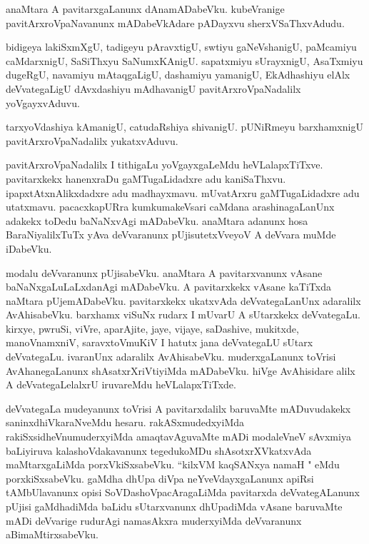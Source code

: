 \documentclass{article}
\begin{document}
\begin{mn}%
anaMtara A pavitarxgaLanunx dAnamADabeVku. kubeVranige pavitArxroVpaNavanunx mADabeVkAdare pADayxvu 
sherxVSaThxvAdudu.
\end{mn}

\begin{mn}%
bidigeya lakiSxmXgU, tadigeyu pAravxtigU, swtiyu gaNeVshanigU, paMcamiyu caMdarxnigU, SaSiThxyu 
SaNumxKAnigU. sapatxmiyu sUrayxnigU, AsaTxmiyu dugeRgU, navamiyu mAtaqgaLigU, dashamiyu yamanigU, 
EkAdhashiyu elAlx deVvategaLigU dAvxdashiyu mAdhavanigU pavitArxroVpaNadalilx yoVgayxvAduvu.
\end{mn}

\begin{mn}%
tarxyoVdashiya kAmanigU, catudaRshiya shivanigU. pUNiRmeyu barxhamxnigU pavitArxroVpaNadalilx 
yukatxvAduvu.
\end{mn}

\begin{mn}%
pavitArxroVpaNadalilx I tithigaLu yoVgayxgaLeMdu heVLalapxTiTxve. pavitarxkekx hanenxraDu 
gaMTugaLidadxre adu kaniSaThxvu. ipapxtAtxnAlikxdadxre adu madhayxmavu. mUvatArxru gaMTugaLidadxre 
adu utatxmavu. pacacxkapURra kumkumakeVsari caMdana arashinagaLanUnx adakekx toDedu baNaNxvAgi 
mADabeVku. anaMtara adanunx hosa BaraNiyalilxTuTx yAva deVvaranunx pUjisutetxVveyoV A deVvara 
muMde iDabeVku.
\end{mn}

\begin{mn}%
modalu deVvaranunx pUjisabeVku. anaMtara A pavitarxvanunx vAsane  baNaNxgaLuLaLxdanAgi mADabeVku. A 
pavitarxkekx vAsane kaTiTxda naMtara pUjemADabeVku. pavitarxkekx ukatxvAda deVvategaLanUnx 
adaralilx AvAhisabeVku. barxhamx viSuNx rudarx I mUvarU A sUtarxkekx deVvategaLu. kirxye, pwruSi, 
viVre, aparAjite, jaye, vijaye, saDashive, mukitxde, manoVnamxniV, saravxtoVmuKiV I hatutx jana 
deVvategaLU sUtarx deVvategaLu. ivaranUnx adaralilx AvAhisabeVku. muderxgaLanunx toVrisi 
AvAhanegaLanunx shAsatxrXriVtiyiMda mADabeVku. hiVge AvAhisidare alilx A deVvategaLelalxrU 
iruvareMdu heVLalapxTiTxde.
\end{mn}

\begin{mn}%
deVvategaLa mudeyanunx toVrisi A pavitarxdalilx baruvaMte mADuvudakekx saninxdhiVkaraNveMdu hesaru. 
rakASxmudedxyiMda rakiSxsidheVnumuderxyiMda amaqtavAguvaMte mADi modaleVneV sAvxmiya baLiyiruva 
kalashoVdakavanunx tegedukoMDu shAsotxrXVkatxvAda maMtarxgaLiMda porxVkiSxsabeVku. ``kilxVM 
kaqSANxya namaH " eMdu porxkiSxsabeVku. gaMdha dhUpa diVpa neYveVdayxgaLanunx apiRsi tAMbUlavanunx 
opisi SoVDashoVpacAragaLiMda pavitarxda deVvategALanunx pUjisi gaMdhadiMda baLidu sUtarxvanunx 
dhUpadiMda vAsane baruvaMte mADi deVvarige rudurAgi namasAkxra muderxyiMda deVvaranunx 
aBimaMtirxsabeVku.
\end{mn}
\end{document}

